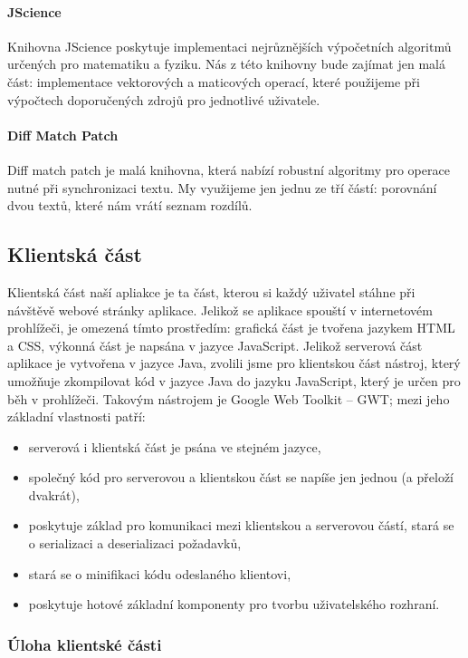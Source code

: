 \paragraph{JScience}
Knihovna JScience poskytuje implementaci nejrůznějších výpočetních algoritmů určených pro matematiku a fyziku.
Nás z této knihovny bude zajímat jen malá část: implementace vektorových a maticových operací, které použijeme při výpočtech doporučených zdrojů pro jednotlivé uživatele.

\paragraph{Diff Match Patch}
Diff match patch je malá knihovna, která nabízí robustní algoritmy pro operace nutné při synchronizaci textu.
My využijeme jen jednu ze tří částí: porovnání dvou textů, které nám vrátí seznam rozdílů.

\subsection{Klientská část}

Klientská část naší apliakce je ta část, kterou si každý uživatel stáhne při návštěvě webové stránky aplikace.
Jelikož se aplikace spouští v internetovém prohlížeči, je omezená tímto prostředím: grafická část je tvořena jazykem HTML a CSS, výkonná část je napsána v jazyce JavaScript.
Jelikož serverová část aplikace je vytvořena v jazyce Java, zvolili jsme pro klientskou část nástroj, který umožňuje zkompilovat kód v jazyce Java do jazyku JavaScript, který je určen pro běh v prohlížeči.
Takovým nástrojem je Google Web Toolkit -- GWT; mezi jeho základní vlastnosti patří:
\begin{itemize}
	\item serverová i klientská část je psána ve stejném jazyce,
	\item společný kód pro serverovou a klientskou část se napíše jen jednou (a přeloží dvakrát),
	\item poskytuje základ pro komunikaci mezi klientskou a serverovou částí, stará se o serializaci a deserializaci požadavků,
	\item stará se o minifikaci kódu odeslaného klientovi,
	\item poskytuje hotové základní komponenty pro tvorbu uživatelského rozhraní.
\end{itemize}

\subsubsection{Úloha klientské části}

